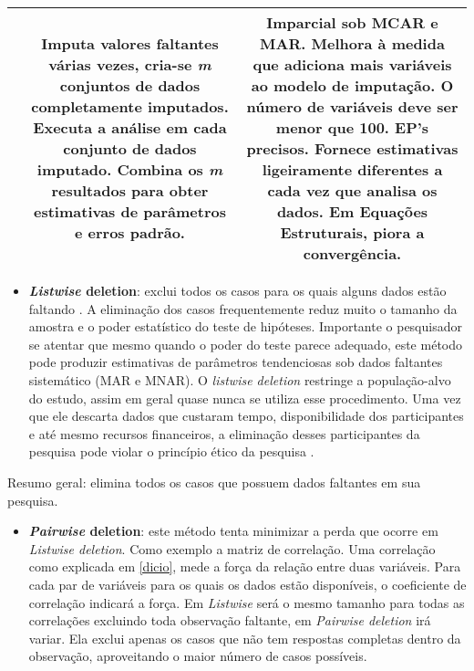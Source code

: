 \documentclass[
  openany]{book}
\providecommand{\tightlist}{%
  \setlength{\itemsep}{0pt}\setlength{\parskip}{0pt}}
\begin{document}
\begin{longtable}[]{@{}ccc@{}}
\begin{minipage}[t]{0.30\columnwidth}
\end{minipage} & \begin{minipage}[t]{0.30\columnwidth}\centering
Imputa valores faltantes várias vezes, cria-se \emph{m} conjuntos de dados completamente imputados. Executa a análise em cada conjunto de dados imputado. Combina os \emph{m} resultados para obter estimativas de parâmetros e erros padrão.\strut
\end{minipage} & \begin{minipage}[t]{0.30\columnwidth}\centering
Imparcial sob MCAR e MAR. Melhora à medida que adiciona mais variáveis ao modelo de imputação. O número de variáveis deve ser menor que 100. EP's precisos. Fornece estimativas ligeiramente diferentes a cada vez que analisa os dados. Em Equações Estruturais, piora a convergência.\strut
\end{minipage}\tabularnewline
\bottomrule
\end{longtable}

\begin{itemize}
\tightlist
\item
  \textbf{\emph{Listwise} deletion}: exclui todos os casos para os quais alguns dados estão faltando . A eliminação dos casos frequentemente reduz muito o tamanho da amostra e o poder estatístico do teste de hipóteses. Importante o pesquisador se atentar que mesmo quando o poder do teste parece adequado, este método pode produzir estimativas de parâmetros tendenciosas sob dados faltantes sistemático (MAR e MNAR). O \emph{listwise deletion} restringe a população-alvo do estudo, assim em geral quase nunca se utiliza esse procedimento. Uma vez que ele descarta dados que custaram tempo, disponibilidade dos participantes e até mesmo recursos financeiros, a eliminação desses participantes da pesquisa pode violar o princípio ético da pesquisa \citep{rosenthal1994science}.
\end{itemize}

Resumo geral: elimina todos os casos que possuem dados faltantes em sua pesquisa.

\begin{itemize}
\tightlist
\item
  \textbf{\emph{Pairwise} deletion}: este método tenta minimizar a perda que ocorre em \emph{Listwise deletion}. Como exemplo a matriz de correlação. Uma correlação como explicada em \ref{dicio}, mede a força da relação entre duas variáveis. Para cada par de variáveis para os quais os dados estão disponíveis, o coeficiente de correlação indicará a força. Em \emph{Listwise} será o mesmo tamanho para todas as correlações excluindo toda observação faltante, em \emph{Pairwise deletion} irá variar. Ela exclui apenas os casos que não tem respostas completas dentro da observação, aproveitando o maior número de casos possíveis.
\end{itemize}
\end{document}
